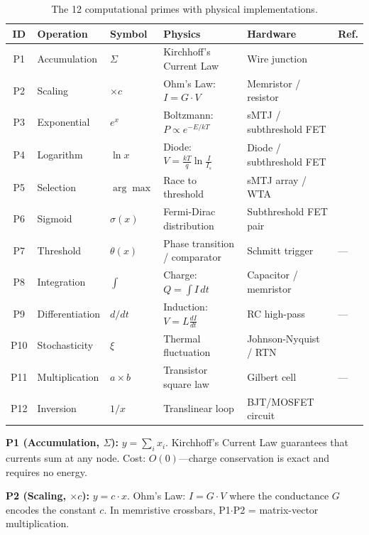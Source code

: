 \documentclass[11pt]{article}
\begin{document}
\begin{table}[t]
\centering
\caption{The 12 computational primes with physical implementations.}
\label{tab:primes}
\footnotesize
\begin{tabular}{clllll}
\toprule
ID & Operation & Symbol & Physics & Hardware & Ref. \\
\midrule
P1 & Accumulation & $\Sigma$ & Kirchhoff's Current Law & Wire junction & \cite{prezioso2015} \\
P2 & Scaling & $\times c$ & Ohm's Law: $I = G \cdot V$ & Memristor / resistor & \cite{prezioso2015} \\
P3 & Exponential & $e^x$ & Boltzmann: $P \propto e^{-E/kT}$ & sMTJ / subthreshold FET & \cite{bieg2025,sillman2023} \\
P4 & Logarithm & $\ln x$ & Diode: $V = \frac{kT}{q}\ln\frac{I}{I_s}$ & Diode / subthreshold FET & \cite{tageldeen2025} \\
P5 & Selection & $\arg\max$ & Race to threshold & sMTJ array / WTA & \cite{bieg2025,bieg2026} \\
P6 & Sigmoid & $\sigma(x)$ & Fermi-Dirac distribution & Subthreshold FET pair & \cite{mram_sigmoid2022} \\
P7 & Threshold & $\theta(x)$ & Phase transition / comparator & Schmitt trigger & --- \\
P8 & Integration & $\int$ & Charge: $Q = \int I\,dt$ & Capacitor / memristor & \cite{denram2024} \\
P9 & Differentiation & $d/dt$ & Induction: $V = L\frac{dI}{dt}$ & RC high-pass & --- \\
P10 & Stochasticity & $\xi$ & Thermal fluctuation & Johnson-Nyquist / RTN & \cite{cryptoristor2024} \\
P11 & Multiplication & $a \times b$ & Transistor square law & Gilbert cell & --- \\
P12 & Inversion & $1/x$ & Translinear loop & BJT/MOSFET circuit & \cite{tageldeen2025} \\
\bottomrule
\end{tabular}
\end{table}

\textbf{P1 (Accumulation, $\Sigma$):} $y = \sum_i x_i$. Kirchhoff's Current Law guarantees that currents sum at any node. Cost: $O(0)$---charge conservation is exact and requires no energy.

\textbf{P2 (Scaling, $\times c$):} $y = c \cdot x$. Ohm's Law: $I = G \cdot V$ where the conductance $G$ encodes the constant $c$. In memristive crossbars, P1$\cdot$P2 = matrix-vector multiplication.
\end{document}
